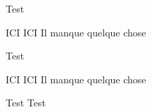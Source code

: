 \documentclass[a4paper]{article}
\newcounter{render}
\newenvironment{toRender}{%
  \addtocounter{render}{1}%
}{%

  \afterpage{\addtocounter{render}{-1}}%

}
\begin{document}
Test \clearpage

\begin{toRender}
  ICI \clearpage
  ICI Il manque quelque chose
\end{toRender}

Test

\begin{toRender}
  ICI \clearpage
  ICI Il manque quelque chose
\end{toRender}

Test \clearpage
Test
\end{document}
